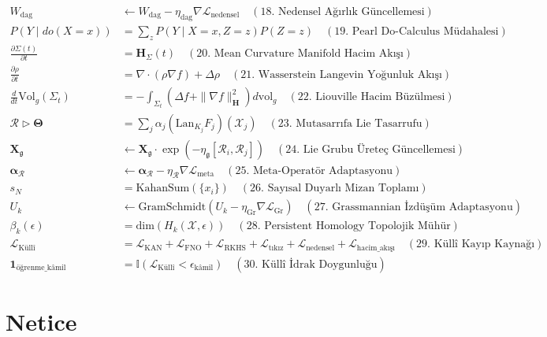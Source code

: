 \documentclass[11pt, a4paper]{article}
\begin{document}
\begin{align}
W_{\text{dag}} &\leftarrow W_{\text{dag}} - \eta_{\text{dag}} \nabla \mathcal{L}_{\text{nedensel}} \quad (\text{18. Nedensel Ağırlık Güncellemesi}) \\
P(Y \mid do(X=x)) &= \sum_z P(Y \mid X=x, Z=z) P(Z=z) \quad (\text{19. Pearl Do-Calculus Müdahalesi}) \\
\frac{\partial \Sigma(t)}{\partial t} &= \mathbf{H}_{\Sigma}(t) \quad (\text{20. Mean Curvature Manifold Hacim Akışı}) \\
\frac{\partial \rho}{\partial t} &= \nabla \cdot (\rho \nabla f) + \Delta \rho \quad (\text{21. Wasserstein Langevin Yoğunluk Akışı}) \\
\frac{d}{dt}\text{Vol}_g(\Sigma_t) &= -\int_{\Sigma_t} (\Delta f + \|\nabla f\|_{\mathbf{H}}^2) d\text{vol}_g \quad (\text{22. Liouville Hacim Büzülmesi}) \\
\mathcal{R} \triangleright \mathbf{\Theta} &= \sum_j \alpha_j (\text{Lan}_{K_j} F_j)(\mathcal{X}_j) \quad (\text{23. Mutasarrıfa Lie Tasarrufu}) \\
\mathbf{X}_{\mathfrak{g}} &\leftarrow \mathbf{X}_{\mathfrak{g}} \cdot \exp(-\eta_{\mathfrak{g}} [\mathcal{R}_i, \mathcal{R}_j]) \quad (\text{24. Lie Grubu Üreteç Güncellemesi}) \\
\bm{\alpha}_{\mathcal{R}} &\leftarrow \bm{\alpha}_{\mathcal{R}} - \eta_{\mathcal{R}} \nabla \mathcal{L}_{\text{meta}} \quad (\text{25. Meta-Operatör Adaptasyonu}) \\
s_N &= \text{KahanSum}(\{x_i\}) \quad (\text{26. Sayısal Duyarlı Mizan Toplamı}) \\
U_k &\leftarrow \text{GramSchmidt}(U_k - \eta_{\text{Gr}} \nabla \mathcal{L}_{\text{Gr}}) \quad (\text{27. Grassmannian İzdüşüm Adaptasyonu}) \\
\beta_k(\epsilon) &= \text{dim}(H_k(\mathcal{X}, \epsilon)) \quad (\text{28. Persistent Homology Topolojik Mühür}) \\
\mathcal{L}_{\text{Küllî}} &= \mathcal{L}_{\text{KAN}} + \mathcal{L}_{\text{FNO}} + \mathcal{L}_{\text{RKHS}} + \mathcal{L}_{\text{tıkız}} + \mathcal{L}_{\text{nedensel}} + \mathcal{L}_{\text{hacim\_akışı}} \quad (\text{29. Küllî Kayıp Kaynağı}) \\
\mathbf{1}_{\text{öğrenme\_kâmil}} &= \mathbb{I}\left( \mathcal{L}_{\text{Küllî}} < \epsilon_{\text{kâmil}} \right) \quad (\text{30. Küllî İdrak Doygunluğu})
\end{align}

\section{Netice}
\end{document}
